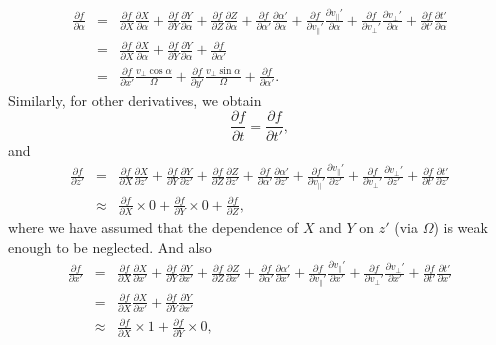 \documentclass{article}
\begin{document}
\begin{eqnarray}
  \frac{\partial f}{\partial \alpha} & = & \frac{\partial f}{\partial X}
  \frac{\partial X}{\partial \alpha} + \frac{\partial f}{\partial Y}
  \frac{\partial Y}{\partial \alpha} + \frac{\partial f}{\partial Z}
  \frac{\partial Z}{\partial \alpha} + \frac{\partial f}{\partial \alpha'}
  \frac{\partial \alpha'}{\partial \alpha} + \frac{\partial f}{\partial
  v_{\parallel}'} \frac{\partial v_{\parallel}'}{\partial \alpha} +
  \frac{\partial f}{\partial v_{\perp}'} \frac{\partial v_{\perp}'}{\partial
  \alpha} + \frac{\partial f}{\partial t'} \frac{\partial t'}{\partial \alpha}
  \nonumber\\
  & = & \frac{\partial f}{\partial X} \frac{\partial X}{\partial \alpha} +
  \frac{\partial f}{\partial Y} \frac{\partial Y}{\partial \alpha} +
  \frac{\partial f}{\partial \alpha'} \nonumber\\
  & = & \frac{\partial f}{\partial x'} \frac{v_{\perp} \cos \alpha}{\Omega} +
  \frac{\partial f}{\partial y'} \frac{v_{\perp} \sin \alpha}{\Omega} +
  \frac{\partial f}{\partial \alpha'} . 
\end{eqnarray}
Similarly, for other derivatives, we obtain
\begin{equation}
  \frac{\partial f}{\partial t} = \frac{\partial f}{\partial t'},
\end{equation}
and
\begin{eqnarray}
  \frac{\partial f}{\partial z'} & = & \frac{\partial f}{\partial X}
  \frac{\partial X}{\partial z'} + \frac{\partial f}{\partial Y}
  \frac{\partial Y}{\partial z'} + \frac{\partial f}{\partial Z}
  \frac{\partial Z}{\partial z'} + \frac{\partial f}{\partial \alpha'}
  \frac{\partial \alpha'}{\partial z'} + \frac{\partial f}{\partial
  v_{\parallel}'} \frac{\partial v_{\parallel}'}{\partial z'} + \frac{\partial
  f}{\partial v_{\perp}'} \frac{\partial v_{\perp}'}{\partial z'} +
  \frac{\partial f}{\partial t'} \frac{\partial t'}{\partial z'} \nonumber\\
  & \approx & \frac{\partial f}{\partial X} \times 0 + \frac{\partial
  f}{\partial Y} \times 0 + \frac{\partial f}{\partial Z}, 
\end{eqnarray}
where we have assumed that the dependence of $X$ and $Y$ on $z'$ (via
$\Omega$) is weak enough to be neglected. And also
\begin{eqnarray}
  \frac{\partial f}{\partial x'} & = & \frac{\partial f}{\partial X}
  \frac{\partial X}{\partial x'} + \frac{\partial f}{\partial Y}
  \frac{\partial Y}{\partial x'} + \frac{\partial f}{\partial Z}
  \frac{\partial Z}{\partial x'} + \frac{\partial f}{\partial \alpha'}
  \frac{\partial \alpha'}{\partial x'} + \frac{\partial f}{\partial
  v_{\parallel}'} \frac{\partial v_{\parallel}'}{\partial x'} + \frac{\partial
  f}{\partial v_{\perp}'} \frac{\partial v_{\perp}'}{\partial x'} +
  \frac{\partial f}{\partial t'} \frac{\partial t'}{\partial x'} \nonumber\\
  & = & \frac{\partial f}{\partial X} \frac{\partial X}{\partial x'} +
  \frac{\partial f}{\partial Y} \frac{\partial Y}{\partial x'} \nonumber\\
  & \approx & \frac{\partial f}{\partial X} \times 1 + \frac{\partial
  f}{\partial Y} \times 0, 
\end{eqnarray}
\end{document}
